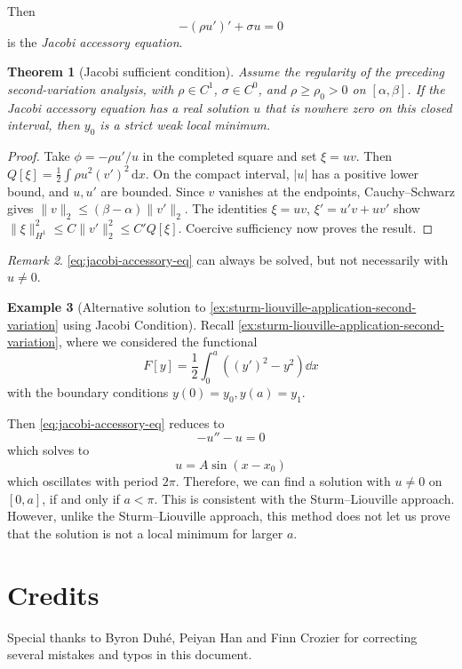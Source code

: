 \documentclass[11pt]{article}
\numberwithin{equation}{section}
\newtheorem{theorem}{Theorem}[section]
\theoremstyle{definition}
\newtheorem{example}[theorem]{Example}
\theoremstyle{remark}
\newtheorem{remark}[theorem]{Remark}
\newcommand{\pqty}[1]{\left(#1\right)}
\newcommand{\bqty}[1]{\left[#1\right]}
\newcommand{\ccintv}[2]{[#1,#2]}
\begin{document}
Then
\begin{equation}
    \label{eq:jacobi-accessory-eq}%
    - \pqty{\rho u'}' + \sigma u = 0
\end{equation}
is the \emph{Jacobi accessory equation}.

\begin{theorem}[Jacobi sufficient condition]\label{variation-unit-0102}
Assume the regularity of the preceding second-variation analysis, with
\(\rho\in C^1\), \(\sigma\in C^0\), and \(\rho\ge\rho_0>0\) on
\([\alpha,\beta]\). If the Jacobi accessory equation has a real solution \(u\)
that is nowhere zero on this closed interval, then \(y_0\) is a strict weak local minimum.
\end{theorem}
\begin{proof}
Take \(\phi=-\rho u'/u\) in the completed square and set \(\xi=u v\).
Then \(Q[\xi]=\tfrac12\int\rho u^2(v')^2\,\mathrm dx\).
On the compact interval, \(|u|\) has a positive lower bound, and \(u,u'\) are bounded.
Since \(v\) vanishes at the endpoints, Cauchy--Schwarz gives
\(\|v\|_2\le(\beta-\alpha)\|v'\|_2\).
The identities \(\xi=uv\), \(\xi'=u'v+uv'\) show
\(\|\xi\|_{H^1}^2\le C\|v'\|_2^2\le C'Q[\xi]\).
Coercive sufficiency now proves the result.
\end{proof}

\begin{remark}\label{variation-unit-0103}
    \autoref{eq:jacobi-accessory-eq} can always be solved, but not necessarily with \(u \neq 0\).
\end{remark}

\begin{example}[Alternative solution to \autoref{ex:sturm-liouville-application-second-variation} using Jacobi Condition]\label{variation-unit-0104}
    Recall \autoref{ex:sturm-liouville-application-second-variation}, where we considered the functional
    \[
        F\bqty{y} = \frac{1}{2} \int_{0}^{a} \pqty{\pqty{y'}^2 - y^2} \dd{x}
    \]
    with the boundary conditions \(y\pqty{0} = y_0, y\pqty{a} = y_1\).
    
    Then \autoref{eq:jacobi-accessory-eq} reduces to
    \[
        - u'' - u = 0
    \]
    which solves to
    \[
        u = A \sin \pqty{x - x_0}
    \]
    which oscillates with period \(2 \pi\). Therefore, we can find a solution with \(u \neq 0\) on \(\ccintv{0}{a}\), if and only if \(a < \pi\). This is consistent with the Sturm--Liouville approach. However, unlike the Sturm--Liouville approach, this method does not let us prove that the solution is not a local minimum for larger \(a\).
\end{example}
\appendix
\section{Credits}

Special thanks to Byron Duh\'{e}, Peiyan Han and Finn Crozier for correcting several mistakes and typos in this document.
\end{document}
